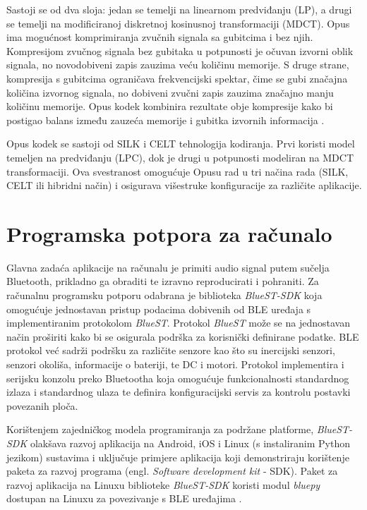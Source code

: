 Sastoji se od dva sloja: jedan se temelji na linearnom predviđanju (LP), a drugi se temelji na modificiranoj diskretnoj kosinusnoj transformaciji (MDCT). Opus ima mogućnost komprimiranja zvučnih signala sa gubitcima i bez njih. Kompresijom zvučnog signala bez gubitaka u potpunosti je očuvan izvorni oblik signala, no novodobiveni zapis zauzima veću količinu memorije. S druge strane, kompresija s gubitcima ograničava frekvencijski spektar, čime se gubi značajna količina izvornog signala, no dobiveni zvučni zapis zauzima značajno manju količinu memorije. Opus kodek kombinira rezultate obje kompresije kako bi postigao balans između zauzeća memorije i gubitka izvornih informacija \cite{opus}. 

Opus kodek se sastoji od SILK i CELT tehnologija kodiranja. Prvi koristi model temeljen na predviđanju (LPC), dok je drugi u potpunosti modeliran na MDCT transformaciji. Ova svestranost omogućuje Opusu rad u tri načina rada (SILK, CELT ili hibridni način) i osigurava višestruke konfiguracije za različite aplikacije.

\section{Programska potpora za računalo}

Glavna zadaća aplikacije na računalu je primiti audio signal putem sučelja Bluetooth, prikladno ga obraditi te izravno reproducirati i pohraniti. Za računalnu programsku potporu odabrana je biblioteka \textit{BlueST-SDK} koja omogućuje jednostavan pristup podacima dobivenih od BLE uređaja s implementiranim protokolom \textit{BlueST}. Protokol \textit{BlueST} može se na jednostavan način proširiti kako bi se osigurala podrška za korisnički definirane podatke. BLE protokol već sadrži podršku za različite senzore kao što su inercijski senzori, senzori okoliša, informacije o bateriji, te DC i motori. Protokol implementira i serijsku konzolu preko Bluetootha koja omogućuje funkcionalnosti standardnog izlaza i standardnog ulaza te definira konfiguracijski servis za kontrolu postavki povezanih ploča. 

Korištenjem zajedničkog modela programiranja za podržane platforme, \textit{BlueST-SDK} olakšava razvoj aplikacija na Android, iOS i Linux (s instaliranim Python jezikom) sustavima i uključuje primjere aplikacija koji demonstriraju korištenje paketa za razvoj programa (engl. \textit{Software development kit} - SDK). Paket za razvoj aplikacija na Linuxu biblioteke \textit{BlueST-SDK} koristi modul \textit{bluepy} dostupan na Linuxu za povezivanje s BLE uređajima \cite{bluest}. 

